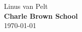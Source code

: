 \begingroup

\newpage
\thispagestyle{empty}


~\vfill

\printMyTitle

~\vfill

\begin{flushright}
  {\LARGE Linus van Pelt}\\
  {\normalsize\textbf{Charle Brown School}}\\
  {\scriptsize\today}
\end{flushright}

\endgroup